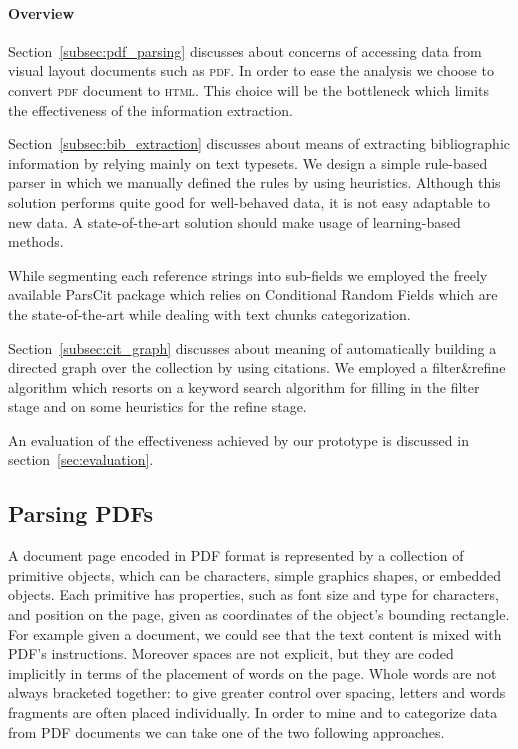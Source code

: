 \paragraph{Overview}Section~\ref{subsec:pdf_parsing} discusses about concerns of accessing data from visual layout documents such as \textsc{pdf}. In order to ease the analysis we choose to convert \textsc{pdf} document to \textsc{html}. This choice will be the bottleneck which limits the effectiveness of the information extraction. 

Section~\ref{subsec:bib_extraction} discusses about means of extracting bibliographic information by relying mainly on text typesets. We design a simple rule-based parser in which we manually defined the rules by using heuristics. Although this solution performs quite good for well-behaved data, it is not easy adaptable to new data. A state-of-the-art solution should make usage of learning-based methods.

While segmenting each reference strings into sub-fields we employed the freely available ParsCit\cite{councill:pos} package which relies on Conditional Random Fields which are the state-of-the-art while dealing with text chunks categorization.

Section~\ref{subsec:cit_graph} discusses about meaning of automatically building a directed graph over the collection by using citations. We employed a filter\&refine algorithm which resorts on a keyword search algorithm for filling in the filter stage and on some heuristics for the refine stage.

An evaluation of the effectiveness achieved by our prototype is discussed in section~\ref{sec:evaluation}.

\subsection{\label{subsec:pdf_parsing}Parsing PDFs}
A document page encoded in PDF format is represented by a collection of primitive objects, which can be characters, simple graphics shapes, or embedded objects. Each primitive has properties, such as font size and type for characters, and position on the page, given as coordinates of the object's bounding rectangle. For example given a document, we could see that the text content is mixed with PDF's instructions. Moreover spaces are not explicit, but they are coded implicitly in terms of the placement of words on the page. Whole words are not always bracketed together: to give greater control over spacing, letters and words fragments are often placed individually. In order to mine and to categorize data from PDF documents we can take one of the two following approaches.


